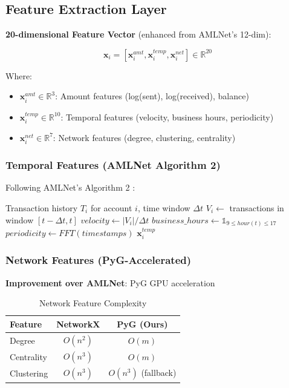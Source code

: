 \documentclass[11pt,a4paper]{article}
\begin{document}
\subsection{Feature Extraction Layer}

\textbf{20-dimensional Feature Vector} (enhanced from AMLNet's 12-dim):

\begin{equation}
\mathbf{x}_i = [\mathbf{x}^{amt}_i, \mathbf{x}^{temp}_i, \mathbf{x}^{net}_i] \in \mathbb{R}^{20}
\end{equation}

Where:
\begin{itemize}
    \item $\mathbf{x}^{amt}_i \in \mathbb{R}^3$: Amount features (log(sent), log(received), balance)
    \item $\mathbf{x}^{temp}_i \in \mathbb{R}^{10}$: Temporal features (velocity, business hours, periodicity)
    \item $\mathbf{x}^{net}_i \in \mathbb{R}^7$: Network features (degree, clustering, centrality)
\end{itemize}

\subsubsection{Temporal Features (AMLNet Algorithm 2)}

Following AMLNet's Algorithm 2 \cite{amlnet2024}:

\begin{algorithm}[H]
\caption{Temporal Feature Extraction}
\begin{algorithmic}[1]
\REQUIRE Transaction history $T_i$ for account $i$, time window $\Delta t$
\STATE $V_i \gets$ transactions in window $[t - \Delta t, t]$
\STATE $velocity \gets |V_i| / \Delta t$ 
\STATE $business\_hours \gets \mathbb{1}_{9 \leq hour(t) \leq 17}$ 
\STATE $periodicity \gets FFT(timestamps)$ 
\RETURN $\mathbf{x}^{temp}_i$
\end{algorithmic}
\end{algorithm}

\subsubsection{Network Features (PyG-Accelerated)}

\textbf{Improvement over AMLNet}: PyG GPU acceleration

\begin{table}[htbp]
\centering
\caption{Network Feature Complexity}
\begin{tabular}{@{}lcc@{}}
\toprule
\textbf{Feature} & \textbf{NetworkX} & \textbf{PyG (Ours)} \\
\midrule
Degree & $O(n^2)$ & $O(m)$ \\
Centrality & $O(n^3)$ & $O(m)$ \\
Clustering & $O(n^3)$ & $O(n^3)$ (fallback) \\
\bottomrule
\end{tabular}
\end{table}
\end{document}
